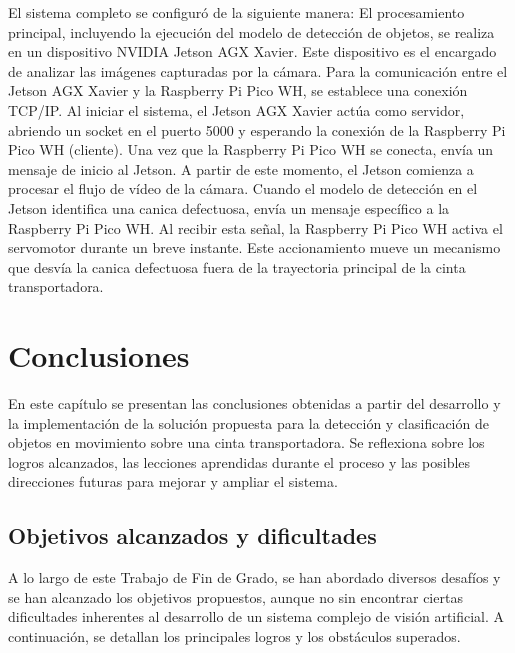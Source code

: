 \documentclass[11pt,spanish,listoffigures,listoftables]{tfgetsinf}
\begin{document}
El sistema completo se configuró de la siguiente manera:
El procesamiento principal, incluyendo la ejecución del modelo de detección de objetos, se realiza en un dispositivo NVIDIA Jetson AGX Xavier. Este dispositivo es el encargado de analizar las imágenes capturadas por la cámara.
Para la comunicación entre el Jetson AGX Xavier y la Raspberry Pi Pico WH, se establece una conexión TCP/IP. Al iniciar el sistema, el Jetson AGX Xavier actúa como servidor, abriendo un socket en el puerto 5000 y esperando la conexión de la Raspberry Pi Pico WH (cliente).
Una vez que la Raspberry Pi Pico WH se conecta, envía un mensaje de inicio al Jetson. A partir de este momento, el Jetson comienza a procesar el flujo de vídeo de la cámara.
Cuando el modelo de detección en el Jetson identifica una canica defectuosa, envía un mensaje específico a la Raspberry Pi Pico WH.
Al recibir esta señal, la Raspberry Pi Pico WH activa el servomotor durante un breve instante. Este accionamiento mueve un mecanismo que desvía la canica defectuosa fuera de la trayectoria principal de la cinta transportadora.






\chapter{Conclusiones} \label{chap:conclusiones}

En este capítulo se presentan las conclusiones obtenidas a partir del desarrollo y la implementación de la solución propuesta para la detección y clasificación de objetos en movimiento sobre una cinta transportadora. Se reflexiona sobre los logros alcanzados, las lecciones aprendidas durante el proceso y las posibles direcciones futuras para mejorar y ampliar el sistema.

\section{Objetivos alcanzados y dificultades}

A lo largo de este Trabajo de Fin de Grado, se han abordado diversos desafíos y se han alcanzado los objetivos propuestos, aunque no sin encontrar ciertas dificultades inherentes al desarrollo de un sistema complejo de visión artificial. A continuación, se detallan los principales logros y los obstáculos superados.
\end{document}
